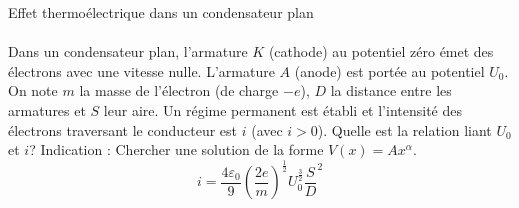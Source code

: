 \documentclass[french, a4paper, 11pt]{article}
\newcommand{\po}{\left(}         %
\newcommand{\pf}{\right)}        %
\newcommand{\pof}[1]{\po #1 \pf} %
\begin{document}
\begin{cadre}{Effet thermoélectrique dans un condensateur plan}
  \paragraph*{}
  Dans un condensateur plan, l'armature \(K\) (cathode) au potentiel zéro émet des électrons avec une vitesse nulle. L'armature \(A\) (anode) est portée au potentiel \(U_{0}\). On note \(m\) la masse de l'électron (de charge \(-e\)), \(D\) la distance entre les armatures et \(S\) leur aire. Un régime permanent est établi et l'intensité des électrons traversant le conducteur est \(i\) (avec \(i>0\)). Quelle est la relation liant \(U_{0}\) et \(i\)?
  \tcblower
  Indication : Chercher une solution de la forme \(V(x)=Ax^{\alpha}\).
  \[i = \dfrac{4\varepsilon_{0}}{9}\pof{\dfrac{2e}{m}}^{\frac{1}{2}}U_{0}^{\frac{3}{2}}\dfrac{S}D^{2}\]
\end{cadre}
\end{document}
